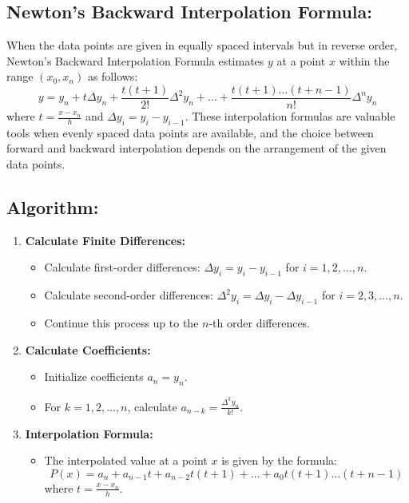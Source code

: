 \documentclass[a4paper,12pt]{report}
\begin{document}
\subsection*{Newton's Backward Interpolation Formula:}
\qquad When the data points are given in equally spaced intervals but in reverse order, Newton's Backward Interpolation Formula estimates $y$ at a point $x$ within the range $(x_0, x_n)$ as follows: \[ y = y_n + t \Delta y_n + \frac{t(t+1)}{2!} \Delta^2 y_n + \ldots + \frac{t(t+1)\ldots(t+n-1)}{n!} \Delta^n y_n \] where $t = \frac{x - x_n}{h}$ and $\Delta y_i = y_i - y_{i-1}$. These interpolation formulas are valuable tools when evenly spaced data points are available, and the choice between forward and backward interpolation depends on the arrangement of the given data points.

\subsection*{Algorithm:}
\begin{enumerate}
    \item \textbf{Calculate Finite Differences:}
          \begin{itemize}
              \item Calculate first-order differences: $\Delta y_i = y_i - y_{i-1}$ for $i = 1, 2, \ldots, n$.
              \item Calculate second-order differences: $\Delta^2 y_i = \Delta y_i - \Delta y_{i-1}$ for $i = 2, 3, \ldots, n$.
              \item Continue this process up to the $n$-th order differences.
          \end{itemize}
    \item \textbf{Calculate Coefficients:}
          \begin{itemize}
              \item Initialize coefficients $a_n = y_n$.
              \item For $k = 1, 2, \ldots, n$, calculate $a_{n-k} = \frac{\Delta^k y_n}{k!}$.
          \end{itemize}
    \item \textbf{Interpolation Formula:}
          \begin{itemize}
              \item The interpolated value at a point $x$ is given by the formula:
                    \[ P(x) = a_n + a_{n-1} t + a_{n-2} t(t+1) + \ldots + a_0 t(t+1)\ldots(t+n-1) \]
                    where $t = \frac{x - x_n}{h}$.
          \end{itemize}
\end{enumerate}
\end{document}
